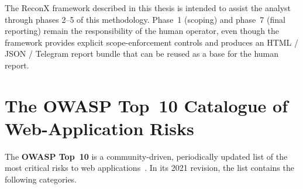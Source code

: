 The ReconX framework described in this thesis is intended to assist the analyst through phases 2--5 of this methodology. Phase~1 (scoping) and phase~7 (final reporting) remain the responsibility of the human operator, even though the framework provides explicit scope-enforcement controls and produces an HTML / JSON / Telegram report bundle that can be reused as a base for the human report.

\section{The OWASP Top~10 Catalogue of Web-Application Risks}
\label{sec:owasp-top10}

The \textbf{OWASP Top~10} is a community-driven, periodically updated list of the most critical risks to web applications~\cite{owasp_top10}. In its 2021 revision, the list contains the following categories.

